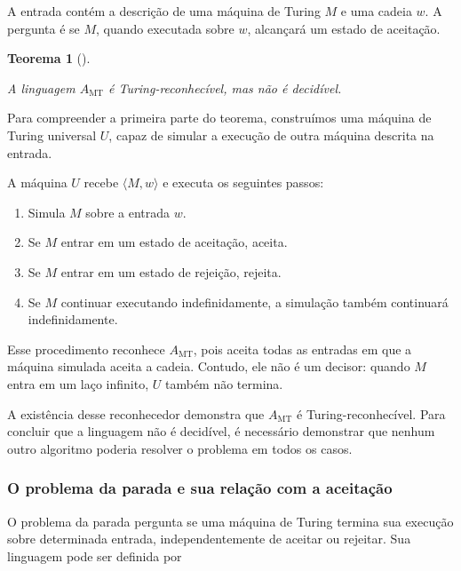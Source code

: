 \documentclass[
  brazilian,
  letterpaper,
]{book}
\providecommand{\tightlist}{%
  \setlength{\itemsep}{0pt}\setlength{\parskip}{0pt}}
\theoremstyle{plain}
\newtheorem{theorem}{Teorema}[chapter]
\theoremstyle{definition}
\theoremstyle{remark}
\begin{document}
A entrada contém a descrição de uma máquina de Turing \(M\) e uma cadeia
\(w\). A pergunta é se \(M\), quando executada sobre \(w\), alcançará um
estado de aceitação.

\begin{theorem}[]\protect\hypertarget{thm-mt}{}\label{thm-mt}

A linguagem \(A_{\mathrm{MT}}\) é Turing-reconhecível, mas não é
decidível.

\end{theorem}

Para compreender a primeira parte do teorema, construímos uma máquina de
Turing universal \(U\), capaz de simular a execução de outra máquina
descrita na entrada.

A máquina \(U\) recebe \(\langle M,w\rangle\) e executa os seguintes
passos:

\begin{enumerate}
\def\labelenumi{\arabic{enumi}.}
\tightlist
\item
  Simula \(M\) sobre a entrada \(w\).
\item
  Se \(M\) entrar em um estado de aceitação, aceita.
\item
  Se \(M\) entrar em um estado de rejeição, rejeita.
\item
  Se \(M\) continuar executando indefinidamente, a simulação também
  continuará indefinidamente.
\end{enumerate}

Esse procedimento reconhece \(A_{\mathrm{MT}}\), pois aceita todas as
entradas em que a máquina simulada aceita a cadeia. Contudo, ele não é
um decisor: quando \(M\) entra em um laço infinito, \(U\) também não
termina.

A existência desse reconhecedor demonstra que \(A_{\mathrm{MT}}\) é
Turing-reconhecível. Para concluir que a linguagem não é decidível, é
necessário demonstrar que nenhum outro algoritmo poderia resolver o
problema em todos os casos.

\subsubsection{O problema da parada e sua relação com a
aceitação}\label{o-problema-da-parada-e-sua-relauxe7uxe3o-com-a-aceitauxe7uxe3o}

O problema da parada pergunta se uma máquina de Turing termina sua
execução sobre determinada entrada, independentemente de aceitar ou
rejeitar. Sua linguagem pode ser definida por
\end{document}
